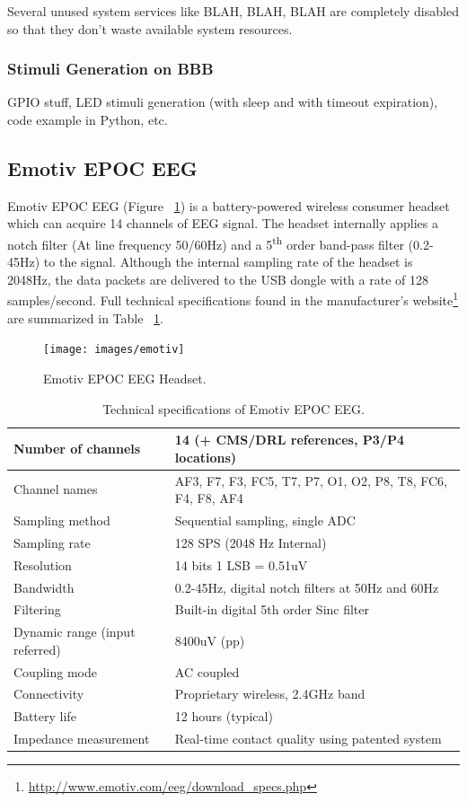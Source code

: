 \documentclass[12pt]{article}
\newcommand\mysubsection[1]{\subsection{#1}}
\newcommand\mysubsubsection[1]{\subsubsection{#1}}
\numberwithin{equation}{section}
\numberwithin{figure}{section}
\numberwithin{table}{section}
\begin{document}
\par{
Several unused system services like BLAH, BLAH, BLAH are completely disabled so that they don't waste available system resources.
}

\mysubsubsection{Stimuli Generation on BBB}\label{seq:embeddedcomputer_stimuligen}
\par{
GPIO stuff, LED stimuli generation (with sleep and with timeout expiration), code example in Python, etc.
}


\mysubsection{Emotiv EPOC EEG}\label{seq:emotivepoceeg}

\par{
    Emotiv EPOC EEG (Figure ~\ref{fig:emotiv_epoc_headset}) is a battery-powered wireless consumer headset which can acquire 14 channels
    of EEG signal. The headset internally applies a notch filter (At line frequency 50/60Hz) and a
    5\textsuperscript{th} order band-pass filter (0.2-45Hz) to the signal. Although the internal sampling rate
    of the headset is 2048Hz, the data packets are delivered to the USB dongle with a rate of 128 samples/second.
    Full technical specifications found in the manufacturer's website\footnote{\url{http://www.emotiv.com/eeg/download_specs.php}} 
    are summarized in Table ~\ref{table:emotiv_epoc_specs}.
}
\begin{figure}[ht]
    \centering
    \texttt{[image: images/emotiv]}
    \caption{Emotiv EPOC EEG Headset.}
    \label{fig:emotiv_epoc_headset}
\end{figure}

\begin{table}
    \footnotesize
    \centering
    \caption{Technical specifications of Emotiv EPOC EEG.}
    \begin{tabular}{| l | l |}
        \hline
        Number of channels & 14 (+ CMS/DRL references, P3/P4 locations) \\ \hline
        Channel names & AF3, F7, F3, FC5, T7, P7, O1, O2, P8, T8, FC6, F4, F8, AF4 \\ \hline
        Sampling method & Sequential sampling, single ADC \\ \hline
        Sampling rate & 128 SPS (2048 Hz Internal) \\ \hline
        Resolution & 14 bits 1 LSB = 0.51uV \\ \hline
        Bandwidth & 0.2-45Hz, digital notch filters at 50Hz and 60Hz \\ \hline
        Filtering & Built-in digital 5th order Sinc filter \\ \hline
        Dynamic range (input referred) & 8400uV (pp) \\ \hline
        Coupling mode & AC coupled \\ \hline
        Connectivity & Proprietary wireless, 2.4GHz band \\ \hline
        Battery life & 12 hours (typical) \\ \hline
        Impedance measurement & Real-time contact quality using patented system \\ \hline
    \end{tabular}
    \label{table:emotiv_epoc_specs}
\end{table}
\end{document}
